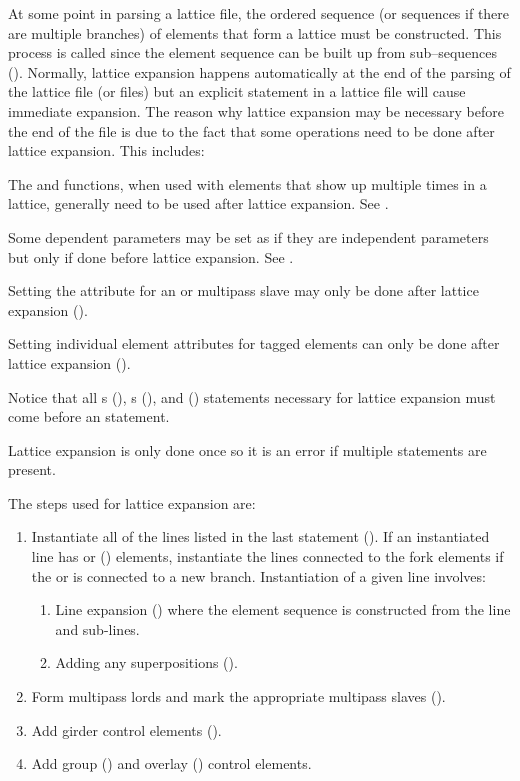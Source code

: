 {{{{{At some point in parsing a lattice file, the ordered sequence (or sequences if there are multiple
branches) of elements that form a lattice must be constructed. This process is called  since the element sequence can be built up from sub--sequences
(). Normally, lattice expansion happens automatically at the end of the parsing of
the lattice file (or files) but an explicit  statement in a lattice file will
cause immediate expansion. The reason why lattice expansion may be necessary before the end of the
file is due to the fact that some operations need to be done after lattice expansion. This includes:
\begin{Itemize}
\item 
{}
The  and  functions, when used with elements
that show up multiple times in a lattice, generally need to be used
after lattice expansion. See .
\item
Some dependent parameters may be set as if they are independent
parameters but only if done before lattice expansion. See .
\item 
Setting the  attribute for an 
 or  multipass
slave may only be done after lattice expansion ().
\item
{}
Setting individual element attributes for tagged elements can only be done
after lattice expansion ().
\end{Itemize}

Notice that all s (), s (), and 
() statements necessary for lattice expansion must come before an 
statement.

Lattice expansion is only done once so it is an error if multiple
 statements are present.

The steps used for lattice expansion are:
\begin{enumerate}
\item
Instantiate all of the lines listed in the last  statement (). If an instantiated line has
 or  () elements, instantiate the lines connected to the fork
elements if the  or  is connected to a new branch. Instantiation of a given
line involves:
\begin{enumerate}
\item
Line expansion () where the element sequence is constructed from the line and sub-lines.
\item
Adding any superpositions ().
\end{enumerate}
\item
Form multipass lords and mark the appropriate multipass slaves ().
\item
Add girder control elements ().
\item
Add group () and overlay () control elements.
\end{enumerate}

}}}}}
